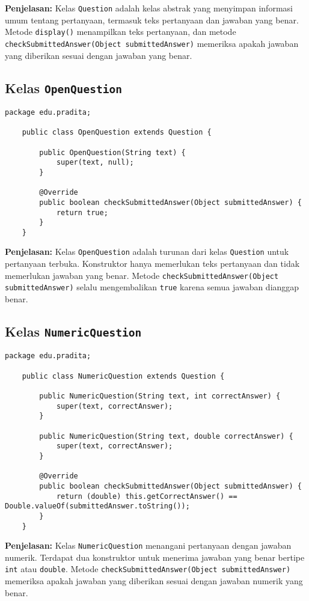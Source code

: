 \textbf{Penjelasan:} Kelas \texttt{Question} adalah kelas abstrak yang menyimpan informasi umum tentang pertanyaan, termasuk teks pertanyaan dan jawaban yang benar. Metode \texttt{display()} menampilkan teks pertanyaan, dan metode \texttt{checkSubmittedAnswer(Object submittedAnswer)} memeriksa apakah jawaban yang diberikan sesuai dengan jawaban yang benar.

\subsection{Kelas \texttt{OpenQuestion}}

\begin{lstlisting}[style=JavaStyle]
	package edu.pradita;
	
	public class OpenQuestion extends Question {
		
		public OpenQuestion(String text) {
			super(text, null);
		}
		
		@Override
		public boolean checkSubmittedAnswer(Object submittedAnswer) {
			return true;
		}
	}
\end{lstlisting}

\textbf{Penjelasan:} Kelas \texttt{OpenQuestion} adalah turunan dari kelas \texttt{Question} untuk pertanyaan terbuka. Konstruktor hanya memerlukan teks pertanyaan dan tidak memerlukan jawaban yang benar. Metode \texttt{checkSubmittedAnswer(Object submittedAnswer)} selalu mengembalikan \texttt{true} karena semua jawaban dianggap benar.

\subsection{Kelas \texttt{NumericQuestion}}

\begin{lstlisting}[style=JavaStyle]
	package edu.pradita;
	
	public class NumericQuestion extends Question {
		
		public NumericQuestion(String text, int correctAnswer) {
			super(text, correctAnswer);
		}
		
		public NumericQuestion(String text, double correctAnswer) {
			super(text, correctAnswer);
		}
		
		@Override
		public boolean checkSubmittedAnswer(Object submittedAnswer) {
			return (double) this.getCorrectAnswer() == Double.valueOf(submittedAnswer.toString());
		}
	}
\end{lstlisting}

\textbf{Penjelasan:} Kelas \texttt{NumericQuestion} menangani pertanyaan dengan jawaban numerik. Terdapat dua konstruktor untuk menerima jawaban yang benar bertipe \texttt{int} atau \texttt{double}. Metode \texttt{checkSubmittedAnswer(Object submittedAnswer)} memeriksa apakah jawaban yang diberikan sesuai dengan jawaban numerik yang benar.

